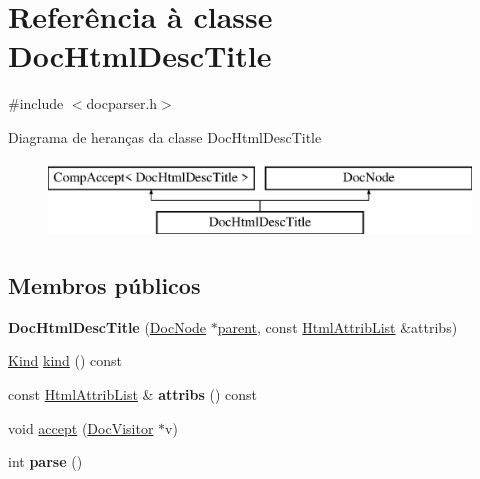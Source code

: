 \hypertarget{class_doc_html_desc_title}{\section{Referência à classe Doc\-Html\-Desc\-Title}
\label{class_doc_html_desc_title}
}


{\ttfamily \#include $<$docparser.\-h$>$}

Diagrama de heranças da classe Doc\-Html\-Desc\-Title\begin{figure}[H]
\begin{center}
\leavevmode
\includegraphics[height=2.000000cm]{class_doc_html_desc_title}
\end{center}
\end{figure}
\subsection*{Membros públicos}
\begin{DoxyCompactItemize}
\item 
\hypertarget{class_doc_html_desc_title_ad5108ae1832471bde530724f52ac5e29}{{\bfseries Doc\-Html\-Desc\-Title} (\hyperlink{class_doc_node}{Doc\-Node} $\ast$\hyperlink{class_doc_node_abd7f070d6b0a38b4da71c2806578d19d}{parent}, const \hyperlink{class_html_attrib_list}{Html\-Attrib\-List} \&attribs)}\label{class_doc_html_desc_title_ad5108ae1832471bde530724f52ac5e29}

\item 
\hyperlink{class_doc_node_aa10c9e8951b8ccf714a59ec321bdac5b}{Kind} \hyperlink{class_doc_html_desc_title_aa9d037bed9f9a083d0cd01485637d843}{kind} () const 
\item 
\hypertarget{class_doc_html_desc_title_aae3c838ea3d3273b35d07e9965a8985e}{const \hyperlink{class_html_attrib_list}{Html\-Attrib\-List} \& {\bfseries attribs} () const }\label{class_doc_html_desc_title_aae3c838ea3d3273b35d07e9965a8985e}

\item 
void \hyperlink{class_doc_html_desc_title_a7ba716e854ae2f8f87a4eb2140e302b6}{accept} (\hyperlink{class_doc_visitor}{Doc\-Visitor} $\ast$v)
\item 
\hypertarget{class_doc_html_desc_title_a67007fc2be130666fbf3b065022756f4}{int {\bfseries parse} ()}\label{class_doc_html_desc_title_a67007fc2be130666fbf3b065022756f4}

\end{DoxyCompactItemize}

